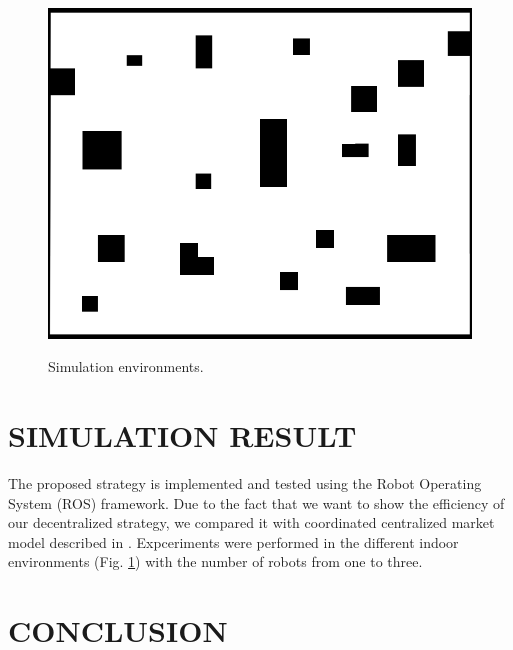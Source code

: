 \documentclass[letterpaper, 10 pt, conference]{ieeeconf}  %
\begin{document}
\begin{figure}[H]
\begin{minipage}{0.3\columnwidth}
		\includegraphics[width=\columnwidth]{unstructured.png}
		\label{fig:unstructured}
	\end{minipage}
 \caption{Simulation environments.}
 \label{fig:1}
\end{figure}

\section{SIMULATION RESULT}
The proposed strategy is implemented and tested using the Robot Operating System (ROS) framework.
Due to the fact that we want to show the efficiency of our decentralized strategy, we compared it with coordinated centralized market model described in \cite{burgard}. Expceriments were performed in the different indoor environments (Fig. \ref{fig:1}) with the number of robots from one to three. 

\newpage
\section{CONCLUSION}


\addtolength{\textheight}{-12cm}   %
\end{document}
